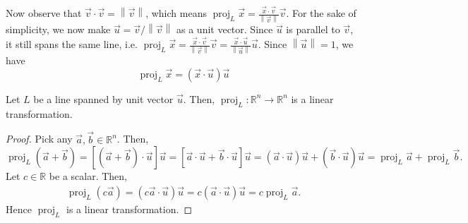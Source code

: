 \documentclass[]{book}
\DeclareMathOperator{\proj}{proj}
\newcommand{\R}{\ensuremath{\mathbb{R}}}
\begin{document}
Now observe that $\vec{v} \cdot \vec{v} = \left\|\vec{v}\right\|$, which means $\proj_L\vec{x} = \frac{\vec{x} \cdot \vec{v}}{\left\|\vec{v}\right\|} \vec{v}$. For the sake of simplicity, we now make $\vec{u} = \vec{v} / \left\|\vec{v}\right\|$ as a unit vector. Since $\vec{u}$ is parallel to $\vec{v}$, it still spans the same line, i.e. $\proj_L\vec{x} = \frac{\vec{x} \cdot \vec{v}}{\left\|\vec{v}\right\|}\vec{v} = \frac{\vec{x} \cdot \vec{u}}{\left\|\vec{u}\right\|}\vec{u}$. Since $\left\|\vec{u}\right\| = 1$, we have
\[\proj_L\vec{x} = \left(\vec{x} \cdot \vec{u}\right) \vec{u}\]

\begin{theorem}
    Let $L$ be a line spanned by unit vector $\vec{u}$. Then, $\proj_L:\R^n \to \R^n$ is a linear transformation.
\begin{proof}
    Pick any $\vec{a},\vec{b} \in \R^n$. Then,
    \[
        \proj_L(\vec{a} + \vec{b}) = \left[\left(\vec{a} + \vec{b}\right) \cdot \vec{u}\right]\vec{u} 
        = \left[\vec{a}\cdot\vec{u} + \vec{b}\cdot\vec{u}\right]\vec{u} 
        = \left(\vec{a}\cdot\vec{u}\right)\vec{u} + \left(\vec{b}\cdot\vec{u}\right)\vec{u} 
        = \proj_L\vec{a} + \proj_L\vec{b}.
    \]
    Let $c\in\R$ be a scalar. Then,
    \begin{align*}
        \proj_L(c\vec{a}) = \left(c\vec{a} \cdot \vec{u}\right)\vec{u} = c(\vec{a}\cdot\vec{u})\vec{u} = c\proj_L\vec{a}.
    \end{align*}
    Hence $\proj_L$ is a linear transformation.
\end{proof}
\end{theorem}
\end{document}
